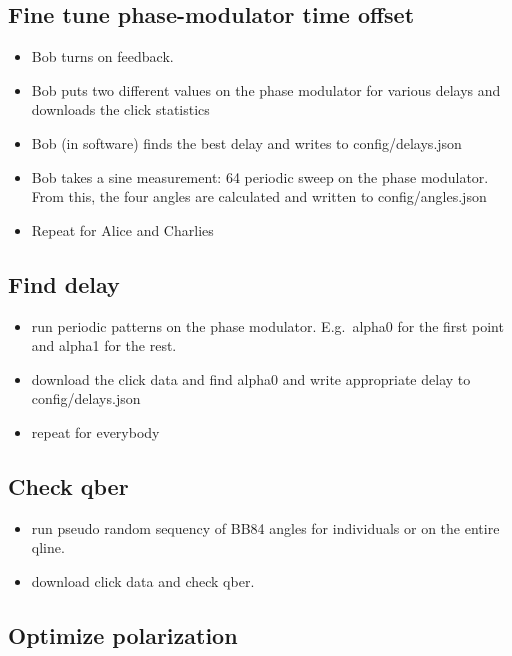 \documentclass[10pt]{article}
\begin{document}
\subsection{Fine tune phase-modulator time offset}

\begin{itemize}
    \item Bob turns on feedback.
    \item Bob puts two different values on the phase modulator for various delays and downloads the click statistics
    \item Bob (in software) finds the best delay and writes to config/delays.json
    \item Bob takes a sine measurement: 64 periodic sweep on the phase modulator. From this, the four angles are calculated and written to config/angles.json
    \item Repeat for Alice and Charlies
\end{itemize}

\subsection{Find delay}

\begin{itemize}
    \item run periodic patterns on the phase modulator. E.g.\ alpha0 for the first point and alpha1 for the rest.
    \item download the click data and find alpha0 and write appropriate delay to config/delays.json
    \item repeat for everybody
\end{itemize}

\subsection{Check qber}

\begin{itemize}
    \item run pseudo random sequency of BB84 angles for individuals or on the entire qline.
    \item download click data and check qber.
\end{itemize}

\subsection{Optimize polarization}
\end{document}
